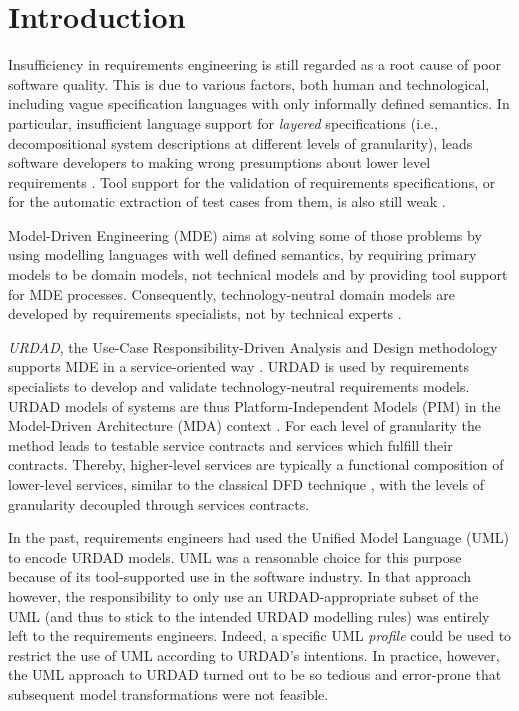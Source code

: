 \section{Introduction}
Insufficiency in requirements engineering is still regarded as a root cause of poor software quality. This is due to various factors, both human and technological, including vague specification languages with only informally defined semantics. In particular, insufficient language support for \emph{layered} specifications (i.e., decompositional system descriptions at different levels of granularity), leads software developers to making wrong presumptions about lower level requirements \cite{espana_evaluating_2009}. Tool support for the validation of requirements specifications, or for the automatic extraction of test cases from them, is also still weak \cite{bashardoust-tajali_extracting_2008}.

Model-Driven Engineering (MDE) \cite{schmidt_model_2006} aims at solving some of those problems by using modelling languages with well defined semantics, by requiring primary models to be domain models, not technical models \cite{asnina_computation_2010} and by providing tool support for MDE processes. Consequently, technology-neutral domain models are developed by requirements specialists, not by technical experts \cite{asnina_computation_2010}.

\emph{URDAD}, the Use-Case Responsibility-Driven Analysis and Design methodology \cite{fritz_solms_technology_2007} supports MDE in a service-oriented way \cite{solms_urdad_2010}. URDAD is used by requirements specialists to develop and validate technology-neutral requirements models. URDAD models of systems are thus Platform-Independent Models (PIM) in the Model-Driven Architecture (MDA) context \cite{solms_urdad_2010}. For each level of granularity the method leads to testable service contracts and services which fulfill their contracts. Thereby, higher-level services are typically a functional composition of lower-level services, similar to the classical DFD technique \cite{demarco_tom_structured_1978}, with the levels of granularity decoupled through services contracts.

In the past, requirements engineers had used the Unified Model Language (UML) to encode URDAD models. UML was a reasonable choice for this purpose because of its tool-supported use in the software industry. In that approach however, the responsibility to only use an URDAD-appropriate subset of the UML (and thus to stick to the intended URDAD modelling rules) was entirely left to the requirements engineers. Indeed, a specific UML \emph{profile} could be used to restrict the use of UML according to URDAD's intentions. In practice, however, the UML approach to URDAD turned out to be so tedious and error-prone that subsequent model transformations were not feasible.

